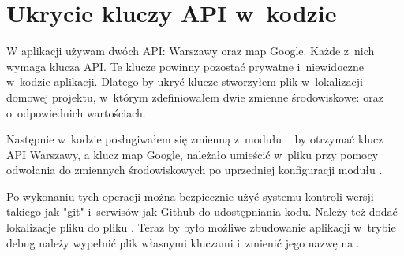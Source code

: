 \documentclass{SGGW-thesis}
\begin{document}
\section{Ukrycie kluczy API w~kodzie}
W aplikacji używam dwóch API: Warszawy oraz map Google.
Każde z~nich wymaga klucza API.
Te klucze powinny pozostać prywatne i~niewidoczne w~kodzie aplikacji.
Dlatego by ukryć klucze stworzyłem plik  w~lokalizacji domowej projektu, w~którym zdefiniowałem dwie zmienne środowiskowe:
 oraz  o~odpowiednich wartościach.

Następnie w~kodzie posługiwałem się zmienną  z~modułu ~\cite{REACTCONFIG} by otrzymać klucz API Warszawy,
a klucz map Google, należało umieścić w~pliku  przy pomocy odwołania do zmiennych środowiskowych po uprzedniej konfiguracji modułu .

Po wykonaniu tych operacji można bezpiecznie użyć systemu kontroli wersji takiego jak "git" i~serwisów jak Github do udostępniania kodu.
Należy też dodać lokalizacje pliku  do pliku .
Teraz by było możliwe zbudowanie aplikacji w~trybie debug należy wypełnić plik  własnymi kluczami i~zmienić jego nazwę na .
\end{document}

